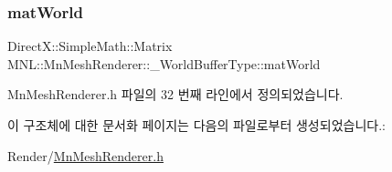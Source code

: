 \subsubsection{\texorpdfstring{mat\+World}{matWorld}}
{\footnotesize\ttfamily Direct\+X\+::\+Simple\+Math\+::\+Matrix M\+N\+L\+::\+Mn\+Mesh\+Renderer\+::\+\_\+\+World\+Buffer\+Type\+::mat\+World}



Mn\+Mesh\+Renderer.\+h 파일의 32 번째 라인에서 정의되었습니다.



이 구조체에 대한 문서화 페이지는 다음의 파일로부터 생성되었습니다.\+:\begin{DoxyCompactItemize}
\item 
Render/\hyperlink{_mn_mesh_renderer_8h}{Mn\+Mesh\+Renderer.\+h}\end{DoxyCompactItemize}
